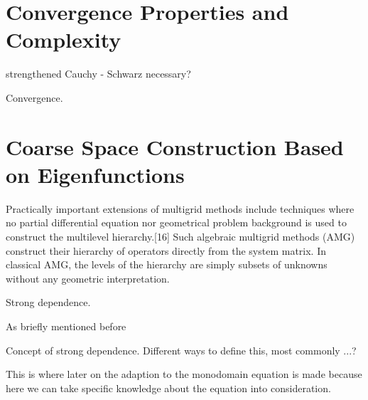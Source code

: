\documentclass[../draft_1.tex]{subfiles}
\begin{document}
\section{Convergence Properties and Complexity}

strengthened Cauchy - Schwarz necessary?


\begin{Theorem}
	Convergence.
\end{Theorem}

\section{Coarse Space Construction Based on Eigenfunctions}

Practically important extensions of multigrid methods include techniques where no partial differential equation nor geometrical problem background is used to construct the multilevel hierarchy.[16] Such algebraic multigrid methods (AMG) construct their hierarchy of operators directly from the system matrix. In classical AMG, the levels of the hierarchy are simply subsets of unknowns without any geometric interpretation.
\smallskip
\\
\begin{Definition}
	Strong dependence.
\end{Definition}

As briefly mentioned before 

Concept of strong dependence. Different ways to define this, most commonly ...? 

This is where later on the adaption to the monodomain equation is made because here we can take specific knowledge about the equation into consideration. 
\end{document}
